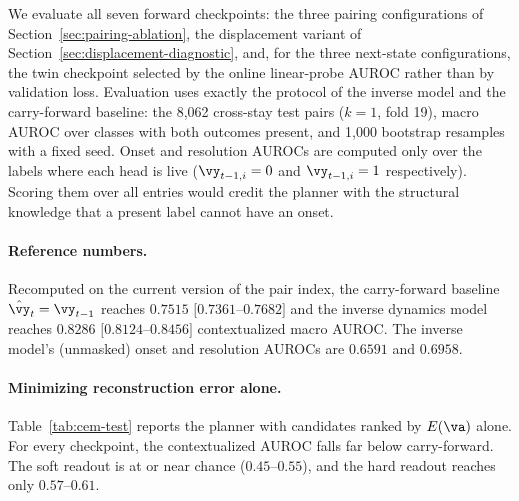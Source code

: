We evaluate all seven forward checkpoints: the three pairing configurations of Section~\ref{sec:pairing-ablation}, the displacement variant of Section~\ref{sec:displacement-diagnostic}, and, for the three next-state configurations, the twin checkpoint selected by the online linear-probe AUROC rather than by validation loss. Evaluation uses exactly the protocol of the inverse model and the carry-forward baseline: the 8{,}062 cross-stay test pairs ($k=1$, fold 19), macro AUROC over classes with both outcomes present, and 1{,}000 bootstrap resamples with a fixed seed. Onset and resolution AUROCs are computed only over the labels where each head is live ($\vy_{t-1,i}=0$ and $\vy_{t-1,i}=1$ respectively). Scoring them over all entries would credit the planner with the structural knowledge that a present label cannot have an onset.

\paragraph{Reference numbers.} Recomputed on the current version of the pair index, the carry-forward baseline $\hat{\vy}_t=\vy_{t-1}$ reaches $0.7515$ $[0.7361$--$0.7682]$ and the inverse dynamics model reaches $0.8286$ $[0.8124$--$0.8456]$ contextualized macro AUROC.
The inverse model's (unmasked) onset and resolution AUROCs are $0.6591$ and $0.6958$.

\paragraph{Minimizing reconstruction error alone.} Table~\ref{tab:cem-test} reports the planner with candidates ranked by $E(\va)$ alone. For every checkpoint, the contextualized AUROC falls far below carry-forward. The soft readout is at or near chance ($0.45$--$0.55$), and the hard readout reaches only $0.57$--$0.61$.

